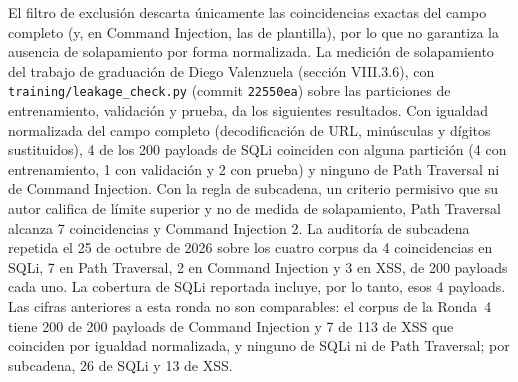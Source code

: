 El filtro de exclusión descarta únicamente las coincidencias exactas del campo completo (y, en
Command Injection, las de plantilla), por lo que no garantiza la ausencia de solapamiento por
forma normalizada. La medición de solapamiento del trabajo de graduación de Diego Valenzuela \cite{valenzuela2026ia}
(sección VIII.3.6), con \texttt{training/leakage\_check.py} (commit \texttt{22550ea}) sobre las
particiones de entrenamiento, validación y prueba, da los siguientes resultados. Con igualdad
normalizada del campo completo (decodificación de URL, minúsculas y dígitos sustituidos), 4 de los
200 payloads de SQLi coinciden con alguna partición (4 con entrenamiento, 1 con validación y 2
con prueba) y ninguno de Path Traversal ni de Command Injection. Con la regla de subcadena, un
criterio permisivo que su autor califica de límite superior y no de medida de solapamiento, Path
Traversal alcanza 7 coincidencias y Command Injection 2. La auditoría de subcadena repetida el 25 de
octubre de 2026 sobre los cuatro corpus da 4 coincidencias en SQLi, 7 en Path Traversal, 2 en
Command Injection y 3 en XSS, de 200 payloads cada uno. La cobertura de SQLi reportada incluye,
por lo tanto, esos 4 payloads. Las cifras anteriores a esta ronda no son comparables: el corpus
de la Ronda~4 tiene 200 de 200 payloads de Command Injection y 7 de 113 de XSS que coinciden por
igualdad normalizada, y ninguno de SQLi ni de Path Traversal; por subcadena, 26 de SQLi y 13 de
XSS.


